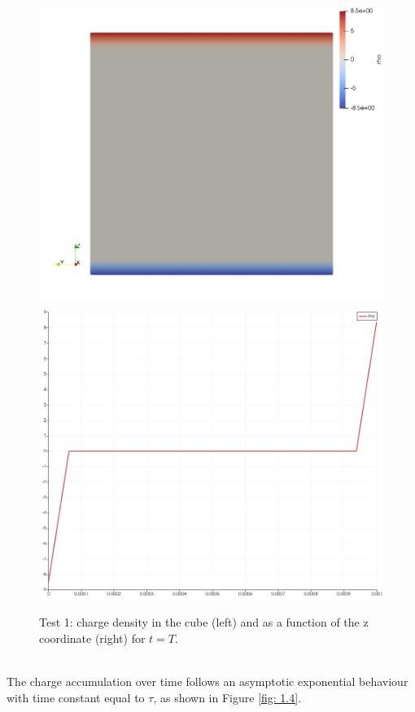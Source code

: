 \documentclass{Configuration_Files/PoliMi3i_thesis}
\begin{document}
\begin{figure}[h!]
    \centering
   \includegraphics[scale=0.2]{Images/1.rho_3d.jpeg}
   \includegraphics[scale=0.2]{Images/1.rho.jpeg}
    \caption {Test 1: charge density in the cube (left) and as a function of the z coordinate (right) for $t=T$.}
    \label{fig: 1.3}
\end{figure}
\\The charge accumulation over time follows an asymptotic exponential behaviour with time constant equal to $\tau$, as shown in Figure \ref{fig: 1.4}.
\end{document}
